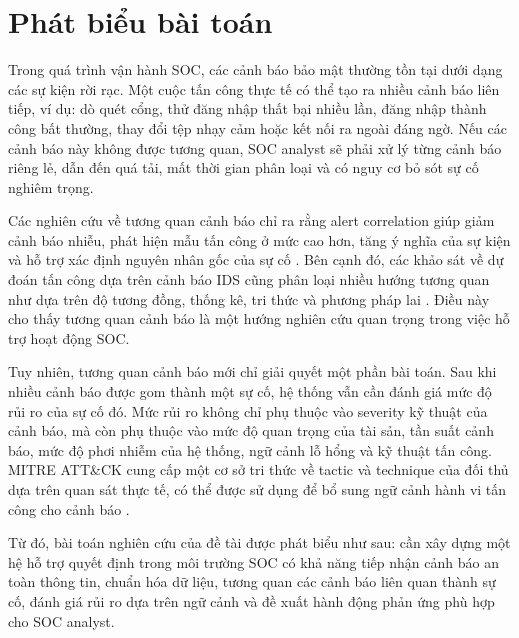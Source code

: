\documentclass[a4paper,12pt,oneside]{book}
\begin{document}
\section{Phát biểu bài toán}
{\fontsize{13pt}{15.6pt}\selectfont

Trong quá trình vận hành SOC, các cảnh báo bảo mật thường tồn tại dưới dạng các sự kiện rời rạc. Một cuộc tấn công thực tế có thể tạo ra nhiều cảnh báo liên tiếp, ví dụ: dò quét cổng, thử đăng nhập thất bại nhiều lần, đăng nhập thành công bất thường, thay đổi tệp nhạy cảm hoặc kết nối ra ngoài đáng ngờ. Nếu các cảnh báo này không được tương quan, SOC analyst sẽ phải xử lý từng cảnh báo riêng lẻ, dẫn đến quá tải, mất thời gian phân loại và có nguy cơ bỏ sót sự cố nghiêm trọng.

\noindent Các nghiên cứu về tương quan cảnh báo chỉ ra rằng alert correlation giúp giảm cảnh báo nhiễu, phát hiện mẫu tấn công ở mức cao hơn, tăng ý nghĩa của sự kiện và hỗ trợ xác định nguyên nhân gốc của sự cố \cite{mirheidari2018alert}. Bên cạnh đó, các khảo sát về dự đoán tấn công dựa trên cảnh báo IDS cũng phân loại nhiều hướng tương quan như dựa trên độ tương đồng, thống kê, tri thức và phương pháp lai \cite{albasheer2022cyber}. Điều này cho thấy tương quan cảnh báo là một hướng nghiên cứu quan trọng trong việc hỗ trợ hoạt động SOC.

\noindent Tuy nhiên, tương quan cảnh báo mới chỉ giải quyết một phần bài toán. Sau khi nhiều cảnh báo được gom thành một sự cố, hệ thống vẫn cần đánh giá mức độ rủi ro của sự cố đó. Mức rủi ro không chỉ phụ thuộc vào severity kỹ thuật của cảnh báo, mà còn phụ thuộc vào mức độ quan trọng của tài sản, tần suất cảnh báo, mức độ phơi nhiễm của hệ thống, ngữ cảnh lỗ hổng và kỹ thuật tấn công. MITRE ATT\&CK cung cấp một cơ sở tri thức về tactic và technique của đối thủ dựa trên quan sát thực tế, có thể được sử dụng để bổ sung ngữ cảnh hành vi tấn công cho cảnh báo \cite{mitreAttack}.

\noindent Từ đó, bài toán nghiên cứu của đề tài được phát biểu như sau: cần xây dựng một hệ hỗ trợ quyết định trong môi trường SOC có khả năng tiếp nhận cảnh báo an toàn thông tin, chuẩn hóa dữ liệu, tương quan các cảnh báo liên quan thành sự cố, đánh giá rủi ro dựa trên ngữ cảnh và đề xuất hành động phản ứng phù hợp cho SOC analyst.

}
\end{document}
